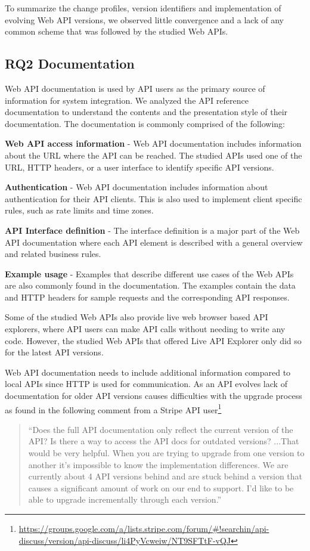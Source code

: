 To summarize the change profiles, version identifiers and implementation of evolving Web API versions, we observed little convergence and a lack of any common scheme that was followed by the studied Web APIs.

\subsection{RQ2 Documentation} %
\label{sub:documentation}
Web API documentation is used by API users as the primary source of information for system integration. We analyzed the API reference documentation to understand the contents and the presentation style of their documentation. The documentation is commonly comprised of the following:

\textbf{Web API access information} - Web API documentation includes information about the URL where the API can be reached. The studied APIs used one of the URL, HTTP headers, or a user interface to identify specific API versions.

\textbf{Authentication} - Web API documentation includes information about authentication for their API clients. This is also used to implement client specific rules, such as rate limits and time zones.

\textbf{API Interface definition} - The interface definition is a major part of the Web API documentation where each API element is described with a general overview  and related business rules.

\textbf{Example usage} - Examples that describe different use cases of the Web APIs are also commonly found in the documentation. The examples contain the data and HTTP headers for sample requests and the corresponding API responses.

Some of the studied Web APIs also provide live web browser based API explorers, where API users can make API calls without needing to write any code. However, the studied Web APIs that offered Live API Explorer only did so for the latest API versions.

Web API documentation needs to include additional information compared to local APIs since HTTP is used for communication. As an API evolves lack of documentation for older API versions causes difficulties with the upgrade process as found in the following comment from a Stripe API user\footnote{\url{https://groups.google.com/a/lists.stripe.com/forum/\#!searchin/api-discuss/version/api-discuss/li4PyVcweiw/NT9SFTtF-vQJ}}

\small
\begin{quotation}
 ``Does the full API documentation only reflect the current version of the
  API?  Is there a way to access the API docs for outdated versions? ...That would be very helpful. When you are trying to upgrade from one version to another it's impossible to know the implementation differences. We are currently about 4 API versions behind and are stuck behind a version that causes a significant amount of work on our end to support. I'd like to be able to upgrade incrementally through each version.''
\end{quotation}
\normalsize

